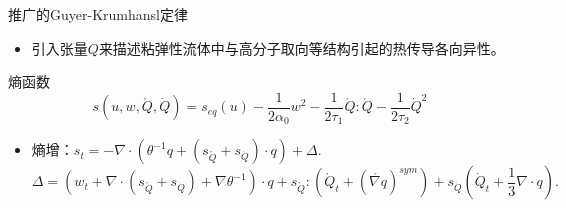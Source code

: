 \documentclass[mathserif]{beamer}
\begin{document}

	\begin{frame}{推广的Guyer-Krumhansl定律}
\begin{itemize}
	\item 引入张量$Q$来描述粘弹性流体中与高分子取向等结构引起的热传导各向异性。%
\end{itemize}
\pause
\begin{block}{熵函数}
\begin{equation*}
s(u,{w},\mathring{{Q}},\dot{Q})=s_{eq}(u)-\frac{1}{2 \alpha_0}{w}^2-\frac{1}{2\tau_1} {\mathring{{Q}}}:{\mathring{{Q}}}-\frac{1}{2\tau_2}\dot{Q}^2
\end{equation*}
\end{block}
\pause
\begin{itemize}
	\item 熵增：$s_t %
	= -\nabla \cdot (\theta^{-1} {q}+ (s_{\mathring{{Q}}}+s_{\dot{Q}}) \cdot {q}) + \Delta$.
	$$\Delta = ({w}_t+\nabla \cdot (s_{\mathring{{Q}}}+s_{\dot{Q}})+\nabla \theta^{-1}) \cdot {q}  +s_{\mathring{{Q}}}:(\mathring{{Q}}_t+(\mathring{\nabla {q}})^{sym})+s_{\dot{Q}}(\dot{Q}_t+\frac{1}{3}\nabla \cdot {q}).$$
\end{itemize}
\end{frame}
\end{document}
